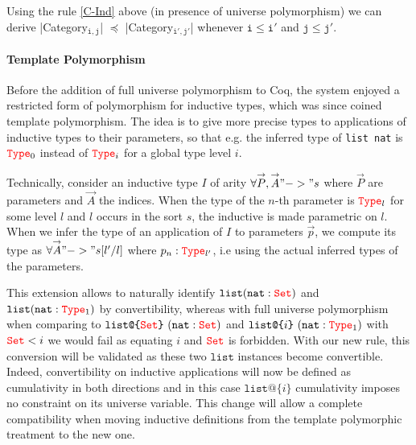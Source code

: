 \documentclass{easychair}
\newcommand{\Type}[1]{{\color{red} \mathtt{Type}}_{#1}}
\newcommand{\Set}{{\color{red} \mathtt{Set}}}
\begin{document}
Using the rule \ref{C-Ind} above (in presence of universe polymorphism)
we can derive
\Coqe|Category$_{\mathtt{i, j}}$| $\preceq$ \Coqe|Category$_{\mathtt{i', j'}}$|
whenever $\mathtt{i \le i'}$ and $\mathtt{j \le j'}$.

\def\vec#1{\overset{\rightarrow}{#1}}
\def\clist{\texttt{list}}
\def\nat{\texttt{nat}}
\def\ulist#1{\texttt{list@\{}#1\texttt{\}}}
\paragraph{Template Polymorphism}

Before the addition of full universe polymorphism to Coq, the system
enjoyed a restricted form of polymorphism for inductive types, which was
since coined template polymorphism. The idea is to give more precise
types to applications of inductive types to their parameters, so that
e.g. the inferred type of \texttt{list nat} is $\Type{0}$ instead of
$\Type{i}$ for a global type level $i$.

Technically, consider an inductive type $I$ of arity
$\forall \vec{P}, \vec{A} "->" s$ where $\vec{P}$ are parameters and
$\vec{A}$ the indices.  When the type of the $n$-th parameter is
$\Type{l}$ for some level $l$ and $l$ occurs in the sort $s$, the
inductive is made parametric on $l$. When we infer the type of an
application of $I$ to parameters $\vec{p}$, we compute its type as
$\forall \vec{A} "->" s[l'/l]$ where $p_n : \Type{l'}$, i.e using the
actual inferred types of the parameters.

This extension allows to naturally identify $\clist (\nat : \Set)$ and
$\clist (\nat : \Type{1})$ by convertibility, whereas with full universe
polymorphism when comparing to $\ulist{\Set}~(\nat : \Set)$ and
$\ulist{i}~ (\nat : \Type{1})$ with $\Set < i$ we would fail as equating
$i$ and $\Set$ is forbidden. With our new rule, this conversion will be
validated as these two $\texttt{list}$ instances become convertible.
Indeed, convertibility on inductive applications will now be defined as
cumulativity in both directions and in this case $\ulist{i}$
cumulativity imposes no constraint on its universe variable. This change
will allow a complete compatibility when moving inductive definitions
from the template polymorphic treatment to the new one.
\end{document}
